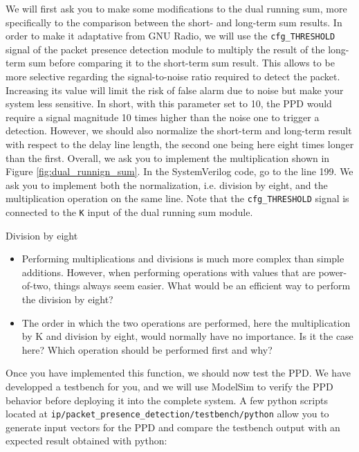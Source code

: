We will first ask you to make some modifications to the dual running sum, more specifically to the comparison between the short- and long-term sum results. In order to make it adaptative from GNU Radio, we will use the \texttt{cfg\_THRESHOLD} signal of the packet presence detection module to multiply the result of the long-term sum before comparing it to the short-term sum result. This allows to be more selective regarding the signal-to-noise ratio required to detect the packet. Increasing its value will limit the risk of false alarm due to noise but make your system less sensitive. In short, with this parameter set to 10, the PPD would require a signal magnitude 10 times higher than the noise one to trigger a detection. However, we should also normalize the short-term and long-term result with respect to the delay line length, the second one being here eight times longer than the first. Overall, we ask you to implement the multiplication shown in Figure \ref{fig:dual_runnign_sum}. In the SystemVerilog code, go to the line 199. We ask you to implement both the normalization, i.e. division by eight, and the multiplication operation on the same line. Note that the \texttt{cfg\_THRESHOLD} signal is connected to the \texttt{K} input of the dual running sum module.


\begin{bclogo}[couleur = gray!20, arrondi = 0.2, logo=\bcquestion]{Division by eight}
    \begin{itemize}
        \item Performing multiplications and divisions is much more complex than simple additions. However, when performing operations with values that are power-of-two, things always seem easier. What would be an efficient way to perform the division by eight?
        \item The order in which the two operations are performed, here the multiplication by K and division by eight, would normally have no importance. Is it the case here? Which operation should be performed first and why?
    \end{itemize}
\end{bclogo}

Once you have implemented this function, we should now test the PPD. We have developped a testbench for you, and we will use ModelSim to verify the PPD behavior before deploying it into the complete system. A few python scripts located at \texttt{ip/packet\_presence\_detection/testbench/python} allow you to generate input vectors for the PPD and compare the testbench output with an expected result obtained with python:

